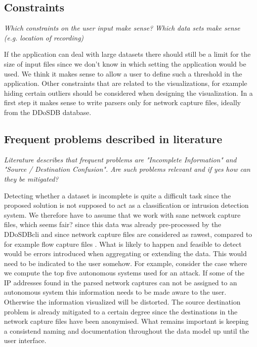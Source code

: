     \subsection{Constraints} 
\textit{Which constraints on the user input make sense? Which data sets make sense (e.g. location of recording)
}

If the application can deal with large datasets there should still be a limit for the size of input files since we don't know in which setting the application would be used. We think it makes sense to allow a user to define such a threshold in the application. Other constraints that are related to the visualizations, for example hiding certain outliers should be considered when designing the visualization.
In a first step it makes sense to write parsers only for network capture files, ideally from the DDoSDB database.
    
    \subsection{Frequent problems described in literature} 
    \textit{Literature describes that frequent problems are "Incomplete Information" and "Source / Destination Confusion". Are such problems relevant and if yes how can they be mitigated?}
    
    Detecting whether a dataset is incomplete is quite a difficult task since the proposed solution is not supposed to act as a classification or intrusion detection system. We therefore have to assume that we work with sane network capture files, which seems fair? since this data was already pre-processed by the DDoSDB\-cli and since network capture files are considered as rawest, compared to for example flow capture files \cite{appliedsecurityvisualization}.
    What is likely to happen and feasible to detect would be errors introduced when aggregating or extending the data. This would need to be indicated to the user somehow. For example, consider the case where we compute the top five autonomous systems used for an attack. If some of the IP addresses found in the parsed network captures can not be assigned to an autonomous system this information needs to be made aware to the user. Otherwise the information visualized will be distorted.
    The source destination problem is already mitigated to a certain degree since the destinations in the network capture files have been anonymised. What remains important is keeping a consistend naming and documentation throughout the data model up until the user interface.
    


